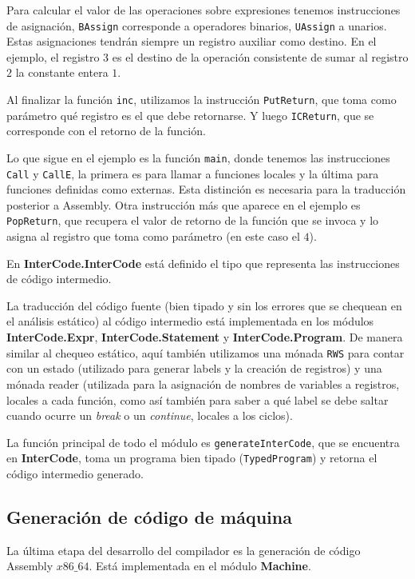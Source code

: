 \documentclass[a4paper,10pt]{article}
\begin{document}
Para calcular el valor de las operaciones sobre expresiones tenemos instrucciones de asignación, \verb|BAssign| corresponde a operadores binarios,
\verb|UAssign| a unarios. Estas asignaciones tendrán siempre un registro auxiliar como destino. En el ejemplo, el registro $3$ es el destino de la operación
consistente de sumar al registro $2$ la constante entera $1$.

Al finalizar la función \verb|inc|, utilizamos la instrucción \verb|PutReturn|, que toma como parámetro qué registro es el que debe retornarse. Y luego
\verb|ICReturn|, que se corresponde con el retorno de la función.

Lo que sigue en el ejemplo es la función \verb|main|, donde tenemos las instrucciones \verb|Call| y \verb|CallE|, la primera es para llamar a funciones
locales y la última para funciones definidas como externas. Esta distinción es necesaria para la traducción posterior a Assembly. Otra instrucción más que aparece
en el ejemplo es \verb|PopReturn|, que recupera el valor de retorno de la función que se invoca y lo asigna al registro que toma como parámetro (en este caso el
$4$).

En \textbf{InterCode.InterCode} está definido el tipo que representa las instrucciones de código intermedio.

La traducción del código fuente (bien tipado y sin los errores que se chequean en el análisis estático) al código intermedio está implementada
en los módulos \textbf{InterCode.Expr}, \textbf{InterCode.Statement} y \textbf{InterCode.Program}. De manera similar al chequeo estático, aquí también
utilizamos una mónada \verb|RWS| para contar con un estado (utilizado para generar labels y la creación de registros) y una mónada reader (utilizada
para la asignación de nombres de variables a registros, locales a cada función, como así también para saber a qué label se debe saltar cuando ocurre
un \textit{break} o un \textit{continue}, locales a los ciclos).

La función principal de todo el módulo es \verb|generateInterCode|, que se encuentra en \textbf{InterCode}, toma un programa bien tipado (\verb|TypedProgram|) 
y retorna el código intermedio generado.

\subsection{Generación de código de máquina}

La última etapa del desarrollo del compilador es la generación de código Assembly $x86\_64$. Está implementada en el módulo \textbf{Machine}. 
\end{document}
